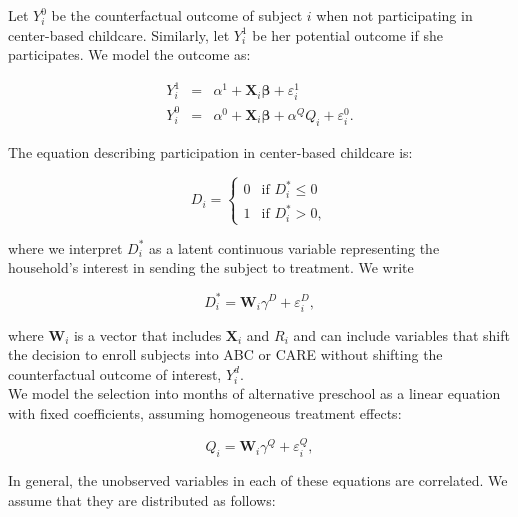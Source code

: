 \begin{appendices}
\noindent Let $Y^{0}_{i}$ be the counterfactual outcome of subject $i$ when not participating in center-based childcare. Similarly, let $Y^{1}_{i}$ be her potential outcome if she participates. We model the outcome as: 
 
\begin{eqnarray}
Y_{i}^1 &=& \alpha^1+\mathbf{X}_{i} \mathbf{\beta}                 +\varepsilon_i^1 \nonumber  \\
Y_{i}^0 &=& \alpha^0+\mathbf{X}_{i} \mathbf{\beta} + \alpha^Q Q_i+\varepsilon_i^0.  \label{eq:potout}
\end{eqnarray}

\noindent The equation describing participation in center-based childcare is: 

\begin{equation}
D_{i} = \left\{
        \begin{array}{ll}
        	0 &\text{if } D_{i}^* \leq  0 \\
            1 &\text{if } D_{i}^* > 0, \label{eq:sel1}
        \end{array}
    \right. 
\end{equation}

\noindent where we interpret $D_{i}^*$ as a latent continuous variable representing the household's interest in sending the subject to treatment. We write

\begin{equation}
D^{*}_i = \mathbf{W}_i \gamma^{D} + \varepsilon^{D}_i, \label{eq:probitD}
\end{equation}

\noindent where $\mathbf{W}_i$ is a vector that includes $\mathbf{X}_i$ and $R_i$ and can include variables that shift the decision to enroll subjects into ABC or CARE without shifting the counterfactual outcome of interest, $Y^{d}_{i}$. \\

\noindent We model the selection into months of alternative preschool as a linear equation with fixed coefficients, assuming homogeneous treatment effects:

\begin{equation}
Q_i = \mathbf{W}_i \gamma^{Q} + \varepsilon^{Q}_i, \label{eq:selq}
\end{equation}

\noindent In general, the unobserved variables in each of these equations are correlated. We assume that they are distributed as follows: 


\end{appendices}
